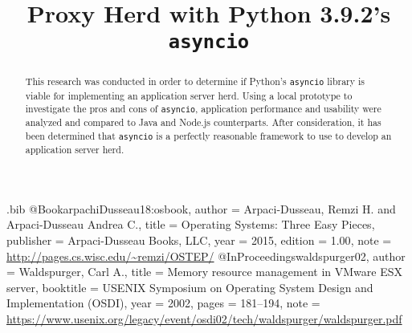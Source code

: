 \usepackage{filecontents}

\begin{filecontents}{\jobname.bib}
@Book{arpachiDusseau18:osbook,
  author =       {Arpaci-Dusseau, Remzi H. and Arpaci-Dusseau Andrea C.},
  title =        {Operating Systems: Three Easy Pieces},
  publisher =    {Arpaci-Dusseau Books, LLC},
  year =         2015,
  edition =      {1.00},
  note =         {\url{http://pages.cs.wisc.edu/~remzi/OSTEP/}}
}
@InProceedings{waldspurger02,
  author =       {Waldspurger, Carl A.},
  title =        {Memory resource management in {VMware ESX} server},
  booktitle =    {USENIX Symposium on Operating System Design and
                  Implementation (OSDI)},
  year =         2002,
  pages =        {181--194},
  note =         {\url{https://www.usenix.org/legacy/event/osdi02/tech/waldspurger/waldspurger.pdf}}}
\end{filecontents}



\date{}

\title{\Large \bf Proxy Herd with Python 3.9.2's \texttt{asyncio}}

\maketitle

\begin{abstract}
This research was conducted in order to determine if Python's \texttt{asyncio} 
library is viable for implementing an application server herd. Using a local
prototype to investigate the pros and cons of \texttt{asyncio}, application
performance and usability were analyzed and compared to Java and Node.js
counterparts. After consideration, it has been determined that \texttt{asyncio} 
is a perfectly reasonable framework to use to develop an application server 
herd.
\end{abstract}

